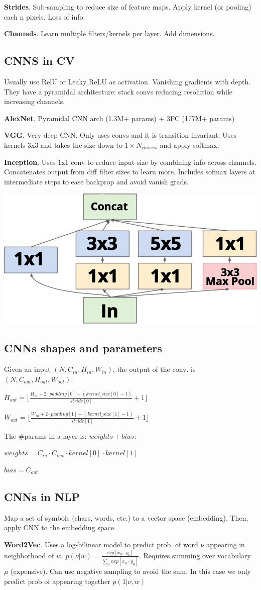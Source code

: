 \textbf{Strides}. Sub-sampling to reduce size of feature maps. Apply kernel (or pooling) each n pixels. Loss of info.

\textbf{Channels}. Learn multiple filters/kernels per layer. Add dimensions.

\subsection*{CNNS in CV}
Usually use RelU or Leaky ReLU as activation. Vanishing gradients with depth. They have a pyramidal architecture: stack convs reducing resolution while increasing channels.

\textbf{AlexNet}. Pyramidal CNN arch (1.3M+ params) + 3FC (177M+ params)

\textbf{VGG}. Very deep CNN. Only uses convs and it is transition invariant. Uses kernels 3x3 and takes the size down to $1\times N_{classes}$ and apply softmax.

\textbf{Inception}. Uses 1x1 conv to reduce input size by combining info across channels. Concatenates output from diff filter sizes to learn more. Includes sofmax layers at intermediate steps to ease backprop and avoid vanish grads.

\includegraphics[width=0.6\columnwidth]{src/custom-inception.jpg}

\subsection*{CNNs shapes and parameters}
Given an input $(N, C_{in}, H_{in}, W_{in})$, the output of the conv. is $(N, C_{out}, H_{out}, W_{out})$:

$H_{out} = \lfloor \frac{H_{in}+2 \cdot padding[0] - (kernel\_size[0] - 1)}{stride[0]} + 1 \rfloor $

$W_{out} = \lfloor \frac{W_{in}+2 \cdot padding[1] - (kernel\_size[1] - 1)}{stride[1]} + 1 \rfloor $

The \#params in a layer is: $weights+bias$:

$weights = C_{in} \cdot C_{out} \cdot kernel[0] \cdot kernel[1]$

$bias = C_{out}$

\subsection*{CNNs in NLP}
Map a set of symbols (chars, words, etc.) to a vector space (embedding). Then, apply CNN to the embedding space.

\textbf{Word2Vec}. Uses a log-bilinear model to predict prob. of word $\nu$ appearing in neighborhood of $w$. $p(\nu|w) = \frac{exp[x_w\cdot y_\nu]}{\sum_\mu exp[x_w\cdot y_\mu]}$. Requires summing over vocabulary $\mu$ (expensive). Can use negative sampling to avoid the sum. In this case we only predict prob of appearing together $p(1|\nu, w)$